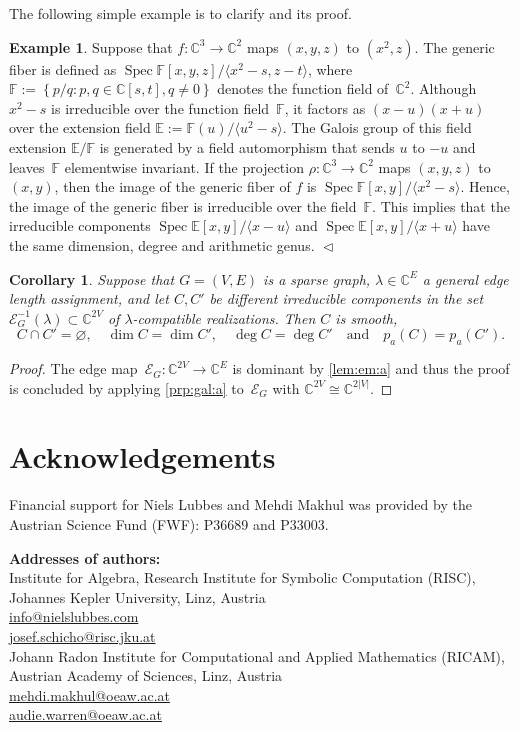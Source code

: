 \documentclass[12pt]{article}
\newtheorem{corollary}{Corollary}
\theoremstyle{definition}
\newtheorem{example}[lemma]{Example}
\newcommand{\RL}[2]{\Cref{lem:#1}\ref{lem:#1:#2}}
\newcommand{\RP}[2]{\Cref{prp:#1}\ref{prp:#1:#2}}
\newcommand{\END}{\hfill $\vartriangleleft$}
\renewcommand{\c}{\colon}
\newcommand{\set}[2]{\left\{#1:#2\right\}}
\newcommand{\C}{{\mathbb{C}}}
\newcommand{\F}{{\mathbb{F}}}
\newcommand{\E}{{\mathbb{E}}}
\newcommand{\cE}{\mathcal{E}}
\newcommand{\Spec}{\operatorname{Spec}}
\begin{document}
The following simple example is to clarify
 and its proof.

\begin{example}
\label{exm:irr}
Suppose that $f\c \C^3\to \C^2$ maps $(x,y,z)$ to $(x^2,z)$.
The generic fiber is defined as $\Spec\F[x,y,z]/\langle x^2-s,z-t\rangle$,
where $\F:=\set{p/q}{p,q\in\C[s,t],q\neq 0}$ denotes the
function field of~$\C^2$.
Although $x^2-s$ is irreducible over the function field~$\F$, it factors as $(x-u)(x+u)$
over the extension field $\E:=\F(u)/\langle u^2-s\rangle$.
The Galois group of this field extension $\E/\F$ is generated by a field automorphism
that sends $u$ to $-u$ and leaves~$\F$ elementwise invariant.
If the projection $\rho\c \C^3\to \C^2$ maps $(x,y,z)$ to $(x,y)$,
then the image of the generic fiber of $f$ is $\Spec\F[x,y]/\langle x^2-s\rangle$.
Hence, the image of the generic fiber is irreducible over the field~$\F$.
This implies that the irreducible components $\Spec\E[x,y]/\langle x-u\rangle$
and $\Spec\E[x,y]/\langle x+u\rangle$
have the same dimension, degree and arithmetic genus.
\END
\end{example}

\begin{corollary}
\label{cor:inv}
Suppose that $G=(V,E)$ is a sparse graph, $\lambda\in\C^E$ a general edge length assignment,
and let $C,C'$ be different irreducible components in the set~$\cE_G^{-1}(\lambda)\subset\C^{2V}$
of $\lambda$-compatible realizations.
Then $C$ is smooth,
\[
C\cap C'=\varnothing,\quad
\dim C=\dim C',\quad
\deg C=\deg C'
\quad\text{and}\quad
p_a(C)=p_a(C').
\]
\end{corollary}

\begin{proof}
The edge map~$\cE_G\c \C^{2V}\to \C^E$ is dominant by \RL{em}{a}
and thus the proof is concluded by applying \RP{gal}{a} to~$\cE_G$ with $\C^{2V}\cong\C^{2|V|}$.
\end{proof}

\section*{Acknowledgements}

Financial support for Niels Lubbes and Mehdi Makhul was provided by the Austrian Science Fund (FWF): P36689 and P33003.



\textbf{Addresses of authors:}
\\Institute for Algebra, Research Institute for Symbolic Computation (RISC),
\\Johannes Kepler University, Linz, Austria
\\\url{info@nielslubbes.com}
\\\url{josef.schicho@risc.jku.at}
\\[2mm]
Johann Radon Institute for Computational and Applied Mathematics (RICAM),
\\Austrian Academy of Sciences, Linz, Austria
\\\url{mehdi.makhul@oeaw.ac.at}
\\\url{audie.warren@oeaw.ac.at}
\end{document}
